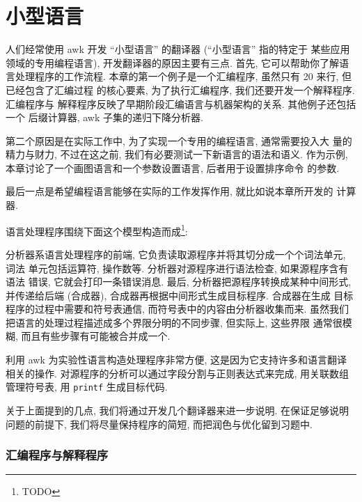 \chapter{小型语言}
\label{chap:little_languages}

人们经常使用 awk 开发 ``小型语言'' 的翻译器 (``小型语言'' 指的特定于
某些应用领域的专用编程语言), 
开发翻译器的原因主要有三点. 首先, 它可以帮助你了解语言处理程序的工作流程.
本章的第一个例子是一个汇编程序, 虽然只有 20 来行, 但已经包含了汇编过程
的核心要素, 为了执行汇编程序, 我们还要开发一个解释程序. 汇编程序与
解释程序反映了早期阶段汇编语言与机器架构的关系. 其他例子还包括一个
后缀计算器, awk 子集的递归下降分析器.

第二个原因是在实际工作中, 为了实现一个专用的编程语言, 通常需要投入大
量的精力与财力, 不过在这之前, 我们有必要测试一下新语言的语法和语义. 
作为示例, 本章讨论了一个画图语言和一个参数设置语言, 后者用于设置排序命令
的参数.

最后一点是希望编程语言能够在实际的工作发挥作用, 就比如说本章所开发的
计算器.

语言处理程序围绕下面这个模型构造而成\footnote{TODO}:

分析器系语言处理程序的前端, 它负责读取源程序并将其切分成一个个词法单元, 词法
单元包括运算符, 操作数等. 分析器对源程序进行语法检查, 如果源程序含有语法
错误, 它就会打印一条错误消息. 最后, 分析器把源程序转换成某种中间形式,
并传递给后端 (合成器), 合成器再根据中间形式生成目标程序. 合成器在生成
目标程序的过程中需要和符号表通信, 而符号表中的内容由分析器收集而来.
虽然我们把语言的处理过程描述成多个界限分明的不同步骤, 但实际上, 这些界限
通常很模糊, 而且有些步骤有可能被合并成一个.

利用 awk 为实验性语言构造处理程序非常方便, 这是因为它支持许多和语言翻译
相关的操作. 对源程序的分析可以通过字段分割与正则表达式来完成, 用关联数组
管理符号表, 用 \texttt{printf} 生成目标代码.

关于上面提到的几点, 我们将通过开发几个翻译器来进一步说明. 在保证足够说明
问题的前提下,  我们将尽量保持程序的简短, 而把润色与优化留到习题中.

\subsection{汇编程序与解释程序}
\label{subsec:an_assembler_and_interpreter}

